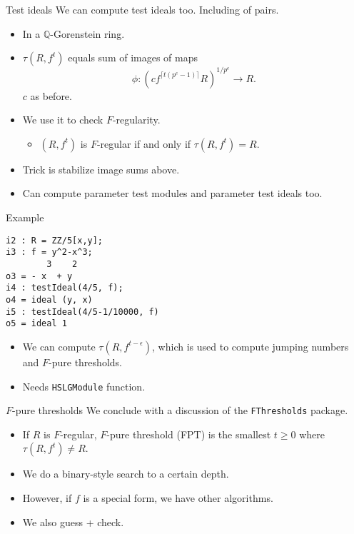 \documentclass[xcolor=dvipsnames]{beamer}
\newcommand{\bQ}{\mathbb{Q}}
\theoremstyle{remark}
\begin{document}
\begin{frame}[c]{Test ideals}
    We can compute test ideals too.  Including of pairs.
    \begin{itemize}
        \item<2-> In a $\bQ$-Gorenstein ring.
        \item<3-> $\tau(R, f^t)$ equals sum of images of maps
        \[
        \phi : (cf^{\lceil t(p^e - 1)\rceil} R)^{1/p^e} \to R.
        \]
        $c$ as before.
        \item<4->  We use it to check $F$-regularity.
        \begin{itemize}
            \item<5->  $(R, f^t)$ is $F$-regular if and only if $\tau(R, f^t) = R$.
        \end{itemize}
        \item<6->  Trick is stabilize image sums above.
        \item<7->  Can compute parameter test modules and parameter test ideals too.
    \end{itemize}
\end{frame}


\begin{frame}[fragile]{Example}
\begin{verbatim}
i2 : R = ZZ/5[x,y];
i3 : f = y^2-x^3;
        3    2
o3 = - x  + y
i4 : testIdeal(4/5, f);
o4 = ideal (y, x)
i5 : testIdeal(4/5-1/10000, f)
o5 = ideal 1
\end{verbatim}
\begin{itemize}
\item<2->We can compute $\tau(R, f^{t-\epsilon})$, which is used to compute jumping numbers and $F$-pure thresholds.
\item<3->Needs {\tt HSLGModule} function.
\end{itemize}
\end{frame}


\begin{frame}[fragile]{$F$-pure thresholds}
    We conclude with a discussion of the {\tt FThresholds} package.
    \begin{itemize}
        \item<2->  If $R$ is $F$-regular, $F$-pure threshold (FPT) is the smallest $t \geq 0$ where $\tau(R, f^t) \neq R$.
        \item<3->  We do a binary-style search to a certain depth.
        \item<4->  However, if $f$ is a special form, we have other algorithms.
        \item<5->  We also guess + check.
    \end{itemize}
\end{frame}
\end{document}
